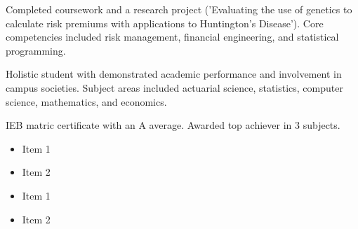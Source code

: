 \documentclass[10pt,a4paper,ragged2e,withhyper]{altacv}
\begin{document}
\begin{paracol}{2}
        
	    Completed coursework and a research project ('Evaluating the use of genetics to calculate risk premiums with applications to Huntington's Disease'). Core competencies included risk management, financial engineering, and statistical programming.

            \divider
            
	    Holistic student with demonstrated academic performance and involvement in campus societies. Subject areas included actuarial science, statistics, computer science, mathematics, and economics.

            \divider

	      IEB matric certificate with an A average. Awarded top achiever in 3 subjects.
        
            \begin{itemize}
                \item Item 1
                \item Item 2
            \end{itemize}
            \divider
            
            \begin{itemize}
                \item Item 1
                \item Item 2
            \end{itemize}
    \end{paracol}
\end{document}
